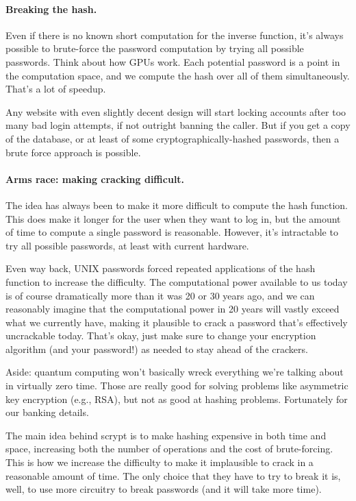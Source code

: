 \documentclass[a4paper]{report}
\begin{document}
\paragraph{Breaking the hash.} Even if there is no known short computation for the
inverse function, it's always possible to brute-force the password
computation by trying all possible passwords. Think about how GPUs
work. Each potential password is a point in the computation space, and
we compute the hash over all of them simultaneously.  That's a lot of
speedup.

Any website with even slightly decent design will start locking accounts after too many bad login attempts, if not outright banning the caller. But if you get a copy of the database, or at least of some cryptographically-hashed passwords, then a brute force approach is possible.

\paragraph{Arms race: making cracking difficult.} The idea has always been
to make it more difficult to compute the hash function. This does make it longer for the user when they want to log in, but the amount of time to compute a single password is reasonable. However, it's intractable to try all possible passwords, at least with current hardware. 

Even way back,
UNIX passwords forced repeated applications of the hash function to increase the difficulty. The computational power available to us today is of course dramatically more than it was 20 or 30 years ago, and we can reasonably imagine that the computational power in 20 years will vastly exceed what we currently have, making it plausible to crack a password that's effectively uncrackable today. That's okay, just make sure to change your encryption algorithm (and your password!) as needed to stay ahead of the crackers.

Aside: quantum computing won't basically wreck everything we're talking about in virtually zero time. Those are really good for solving problems like asymmetric key encryption (e.g., RSA), but not as good at hashing problems. Fortunately for our banking details.

The main idea behind scrypt is to make hashing expensive in both time and space,
increasing both the number of operations and the cost of brute-forcing. This is how we increase the difficulty to make it implausible to crack in a reasonable amount of time. The only choice that they have to try to break it is, well, to use more circuitry to break passwords (and it will take more time).
\end{document}
